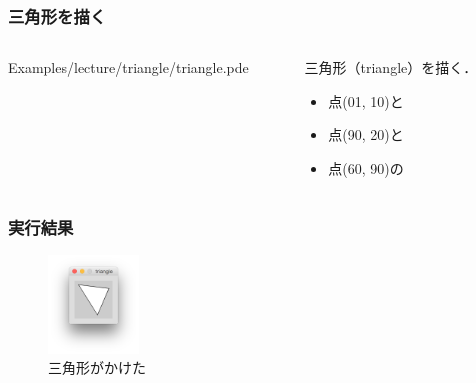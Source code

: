 \documentclass[10pt, dvipdfmx]{beamer}
\begin{document}
        \begin{frame}
            \frametitle{三角形を描く}
            \begin{columns}[c]
                \begin{column}{0.50\textwidth}
                    \tiny
                    Examples/lecture/triangle/triangle.pde
                    \scriptsize
                \end{column}
                \begin{column}{0.50\textwidth}
                    \begin{block}{三角形（triangle）を描く．}
                        \begin{itemize}
                            \item 点(01, 10)と
                            \item 点(90, 20)と
                            \item 点(60, 90)の
                        \end{itemize}
                    \end{block}
                \end{column}
            \end{columns}
        \end{frame}

        \begin{frame}
            \frametitle{実行結果}
                \begin{figure}[htb]
                    \includegraphics[width=24mm]{images/05.png}
                    \caption{三角形がかけた}
                    \label{fig:05}
                \end{figure}
        \end{frame}
\end{document}
